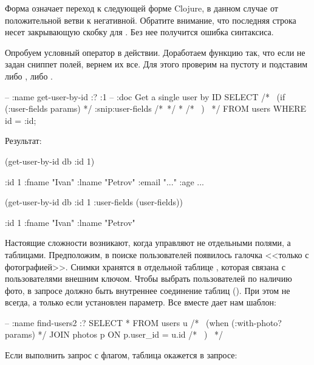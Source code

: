 Форма \code{/*{}\~{}*/} означает переход к следующей форме Clojure, в данном случае от положительной ветви  к негативной. Обратите внимание, что последняя строка несет закрывающую скобку для . Без нее получится ошибка синтаксиса.

Опробуем условный оператор в действии. Доработаем функцию  так, что если не задан сниппет полей, вернем их все. Для этого проверим  на пустоту и подставим либо , либо \code{*}.

\begin{english}
  \begin{sql}
-- :name get-user-by-id :? :1
-- :doc Get a single user by ID
SELECT
/*~ (if (:user-fields params) */
:snip:user-fields
/*~*/
*
/*~ ) ~*/
FROM users
WHERE id = :id;
  \end{sql}
\end{english}

Результат:

\begin{english}
  \begin{clojure}
(get-user-by-id db {:id 1})

{:id 1
 :fname "Ivan"
 :lname "Petrov"
 :email "..."
 :age ...}

(get-user-by-id db {:id 1 :user-fields (user-fields)})

{:id 1
 :fname "Ivan"
 :lname "Petrov"}
  \end{clojure}
\end{english}

Настоящие сложности возникают, когда управляют не отдельными полями, а таблицами. Предположим, в поиске пользователей появилось галочка <<только с фотографией>>. Снимки хранятся в отдельной таблице , которая связана с пользователями внешним ключом. Чтобы выбрать пользователей по наличию фото, в запросе должно быть внутреннее соединение таблиц (). При этом не всегда, а только если установлен параметр. Все вместе дает нам шаблон:

\begin{english}
  \begin{sql}
-- :name find-users2 :?
SELECT * FROM users u
/*~ (when (:with-photo? params) */
JOIN photos p ON p.user_id = u.id
/*~ ) ~*/
  \end{sql}
\end{english}

Если выполнить запрос с флагом, таблица  окажется в запросе:

